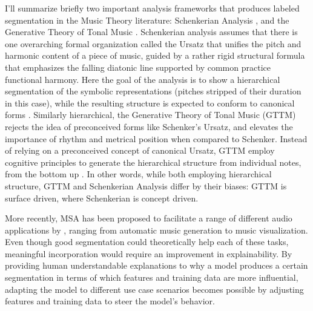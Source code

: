 I’ll summarize briefly two important analysis frameworks that produces labeled segmentation in the Music Theory literature: Schenkerian Analysis \citep{schenker2001free}, and the Generative Theory of Tonal Music \citep{lerdahl1983generative}.
Schenkerian analysis assumes that there is one overarching formal organization called the Ursatz that unifies the pitch and harmonic content of a piece of music, guided by a rather rigid structural formula that emphasizes the falling diatonic line supported by common practice functional harmony. 
Here the goal of the analysis is to show a hierarchical segmentation of the symbolic representations (pitches stripped of their duration in this case), while the resulting structure is expected to conform to canonical forms \citep{schenker2001free}. 
Similarly hierarchical, the Generative Theory of Tonal Music (GTTM) rejects the idea of preconceived forms like Schenker’s Ursatz, and elevates the importance of rhythm and metrical position when compared to Schenker.
Instead of relying on a preconceived concept of canonical Ursatz, GTTM employ cognitive principles to generate the hierarchical structure from individual notes, from the bottom up \citep{lerdahl1983generative}.
In other words, while both employing hierarchical structure, GTTM and Schenkerian Analysis differ by their biases: GTTM is surface driven, where Schenkerian is concept driven.

More recently, MSA has been proposed to facilitate a range of different audio applications by \cite{nieto2020structure}, ranging from automatic music generation to music visualization.
Even though good segmentation could theoretically help each of these tasks, meaningful incorporation would require an improvement in explainability.
By providing human understandable explanations to why a model produces a certain segmentation in terms of which features and training data are more influential, adapting the model to different use case scenarios becomes possible by adjusting features and training data to steer the model's behavior.

